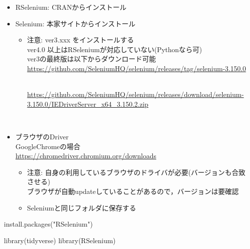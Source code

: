 \documentclass[
]{article}
\newenvironment{Shaded}{\begin{snugshade}}{\end{snugshade}}
\newcommand{\FunctionTok}[1]{\textcolor[rgb]{0.00,0.00,0.00}{#1}}
\newcommand{\NormalTok}[1]{#1}
\newcommand{\StringTok}[1]{\textcolor[rgb]{0.31,0.60,0.02}{#1}}
\providecommand{\tightlist}{%
  \setlength{\itemsep}{0pt}\setlength{\parskip}{0pt}}
\begin{document}
\begin{itemize}
\tightlist
\item
  RSelenium: CRANからインストール\\
\item
  Selenium: 本家サイトからインストール

  \begin{itemize}
  \tightlist
  \item
    注意: ver3.xxx をインストールする\\
    ver4.0 以上はRSeleniumが対応していない(Pythonなら可)\\
    ver3の最終版は以下からダウンロード可能\\
    \url{https://github.com/SeleniumHQ/selenium/releases/tag/selenium-3.150.0}\strut \\
    \url{https://github.com/SeleniumHQ/selenium/releases/download/selenium-3.150.0/IEDriverServer_x64_3.150.2.zip}\strut \\
  \end{itemize}
\item
  ブラウザのDriver\\
  GoogleChromeの場合\\
  \url{https://chromedriver.chromium.org/downloads}

  \begin{itemize}
  \tightlist
  \item
    注意: 自身の利用しているブラウザのドライバが必要(バージョンも合致させる)\\
    ブラウザが自動updateしていることがあるので，バージョンは要確認\\
  \item
    Seleniumと同じフォルダに保存する
  \end{itemize}
\end{itemize}

\begin{Shaded}
\begin{Highlighting}[]
\FunctionTok{install.packages}\NormalTok{(}\StringTok{"RSelenium"}\NormalTok{)}
\end{Highlighting}
\end{Shaded}

\begin{Shaded}
\begin{Highlighting}[]
\FunctionTok{library}\NormalTok{(tidyverse)}
\FunctionTok{library}\NormalTok{(RSelenium)}
\end{Highlighting}
\end{Shaded}
\end{document}
